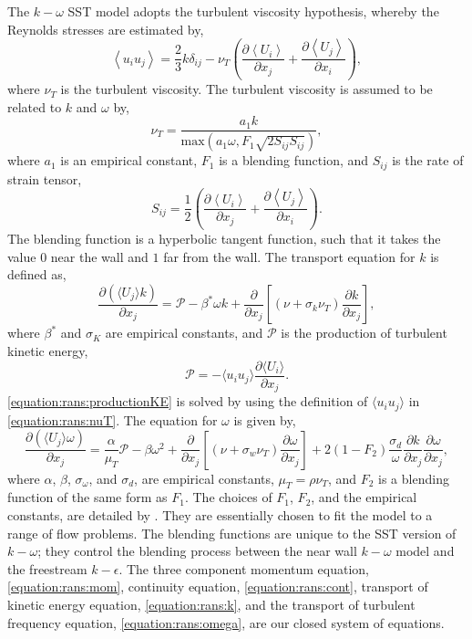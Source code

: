 \documentclass[12pt,oneside,a4paper]{article}
\newcommand{\pdev}[2]{\frac{\partial {#1}}{\partial {#2}}}
\begin{document}
The $k-\omega$ SST model adopts the turbulent viscosity hypothesis, whereby the Reynolds stresses are estimated by,
%
\begin{equation}
 \left< u_i u_j \right> =  \frac{2}{3}k \delta_{ij} - \nu_T \left(
	\pdev{\left< U_i \right>}{x_j} + \pdev{\left< U_j \right>}{x_i}	\right),
\end{equation}
%
where $\nu_T$ is the turbulent viscosity. The turbulent viscosity is assumed to be related to $k$ and $\omega$ by,
%
\begin{equation}
\label{equation:rans:nuT}
\nu_T = \frac{a_1 k}{\text{max}\left( a_1 \omega , F_1 \sqrt{2S_{ij} S_{ij}}\right)},
\end{equation}
%
where $a_1$ is an empirical constant, $F_1$ is a blending function, and $S_{ij}$ is the rate of strain tensor,
%
\begin{equation}
S_{ij} = \frac{1}{2}\left( \pdev{\left< U_i \right>}{x_j} + \pdev{\left< U_j \right>}{x_i} \right).
\end{equation}
%
The blending function is a hyperbolic tangent function, such that it takes the value $0$ near the wall and $1$ far from the wall. The transport equation for $k$ is defined as,
%
\begin{equation}
\label{equation:rans:k}
\pdev{(\langle U_j \rangle k)}{x_j} = \mathcal{P} -\beta^* \omega k + \pdev{}{x_j}\left[ 		\left(		\nu + \sigma_k \nu_T	\right) \pdev{k}{x_j}		 \right],
\end{equation}
%
where $\beta^*$ and $\sigma_K$ are empirical constants, and $\mathcal{P}$ is the production of turbulent kinetic energy,
%
\begin{equation}
\label{equation:rans:productionKE}
\mathcal{P} = -\langle u_i u_j \rangle \pdev{\langle U_i \rangle}{x_j}.
\end{equation}
%
\eqref{equation:rans:productionKE} is solved by using the definition of $\langle u_i u_j \rangle $ in \eqref{equation:rans:nuT}. The equation for $\omega$ is given by,
%
\begin{equation}
\label{equation:rans:omega}
\pdev{(\langle U_j \rangle \omega)}{x_j} = \frac{\alpha}{\mu_T} \mathcal{P} -\beta \omega^2 + \pdev{}{x_j}\left[ 		\left(		\nu + \sigma_w \nu_T	\right) \pdev{\omega}{x_j}		 \right] + 2(1-F_2) \frac{\sigma_d}{\omega} \pdev{k}{x_j}\pdev{\omega}{x_j},
\end{equation}
%
where $\alpha$, $\beta$, $\sigma_\omega$, and $\sigma_d$, are empirical constants, $\mu_T =  \rho \nu_T$, and $F_2$ is a blending function of the same form as $F_1$. The choices of $F_1$, $F_2$, and the empirical constants, are detailed by \cite{menter1994}. They are essentially chosen to fit the model to a range of flow problems. The blending functions are unique to the SST version of $k-\omega$; they control the blending process between the near wall $k-\omega$ model and the freestream $k-\epsilon$. The three component momentum equation, \eqref{equation:rans:mom}, continuity equation, \eqref{equation:rans:cont}, transport of kinetic energy equation, \eqref{equation:rans:k}, and the transport of turbulent frequency equation, \eqref{equation:rans:omega}, are our closed system of equations. 
\end{document}
